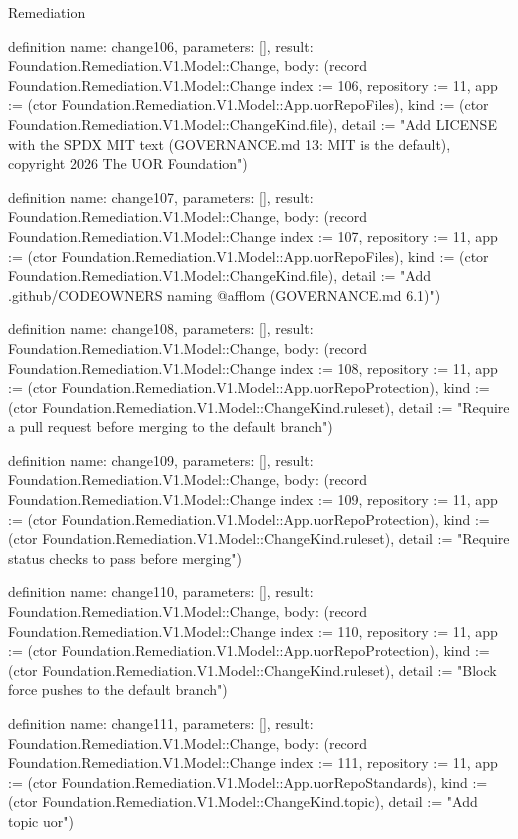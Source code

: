 \begin{lexlean}{Remediation}
\begin{semanticmodule}
definition{
  name: change106,
  parameters: [],
  result: Foundation.Remediation.V1.Model::Change,
  body: (record Foundation.Remediation.V1.Model::Change {index := 106, repository := 11, app := (ctor Foundation.Remediation.V1.Model::App.uorRepoFiles), kind := (ctor Foundation.Remediation.V1.Model::ChangeKind.file), detail := "Add LICENSE with the SPDX MIT text (GOVERNANCE.md 13: MIT is the default), copyright 2026 The UOR Foundation"})
}

definition{
  name: change107,
  parameters: [],
  result: Foundation.Remediation.V1.Model::Change,
  body: (record Foundation.Remediation.V1.Model::Change {index := 107, repository := 11, app := (ctor Foundation.Remediation.V1.Model::App.uorRepoFiles), kind := (ctor Foundation.Remediation.V1.Model::ChangeKind.file), detail := "Add .github/CODEOWNERS naming @afflom (GOVERNANCE.md 6.1)"})
}

definition{
  name: change108,
  parameters: [],
  result: Foundation.Remediation.V1.Model::Change,
  body: (record Foundation.Remediation.V1.Model::Change {index := 108, repository := 11, app := (ctor Foundation.Remediation.V1.Model::App.uorRepoProtection), kind := (ctor Foundation.Remediation.V1.Model::ChangeKind.ruleset), detail := "Require a pull request before merging to the default branch"})
}

definition{
  name: change109,
  parameters: [],
  result: Foundation.Remediation.V1.Model::Change,
  body: (record Foundation.Remediation.V1.Model::Change {index := 109, repository := 11, app := (ctor Foundation.Remediation.V1.Model::App.uorRepoProtection), kind := (ctor Foundation.Remediation.V1.Model::ChangeKind.ruleset), detail := "Require status checks to pass before merging"})
}

definition{
  name: change110,
  parameters: [],
  result: Foundation.Remediation.V1.Model::Change,
  body: (record Foundation.Remediation.V1.Model::Change {index := 110, repository := 11, app := (ctor Foundation.Remediation.V1.Model::App.uorRepoProtection), kind := (ctor Foundation.Remediation.V1.Model::ChangeKind.ruleset), detail := "Block force pushes to the default branch"})
}

definition{
  name: change111,
  parameters: [],
  result: Foundation.Remediation.V1.Model::Change,
  body: (record Foundation.Remediation.V1.Model::Change {index := 111, repository := 11, app := (ctor Foundation.Remediation.V1.Model::App.uorRepoStandards), kind := (ctor Foundation.Remediation.V1.Model::ChangeKind.topic), detail := "Add topic uor"})
}


\end{semanticmodule}
\end{lexlean}
